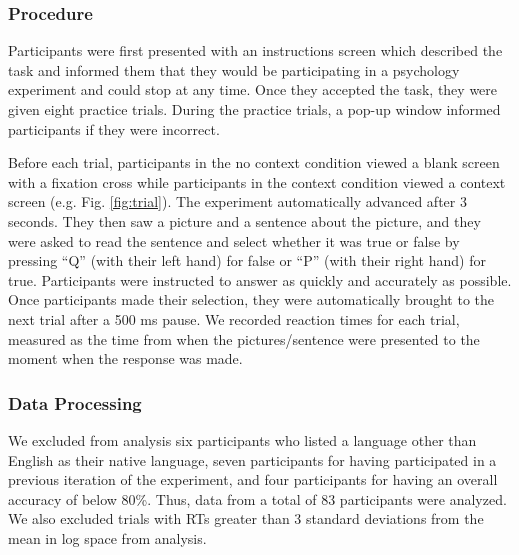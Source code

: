 \documentclass[10pt,letterpaper]{article}
\begin{document}
\subsubsection{Procedure}
Participants were first presented with an instructions screen which described the task and informed them that they would be participating in a psychology experiment and could stop at any time.  Once they accepted the task, they were given eight practice trials.  During the practice trials, a pop-up window informed participants if they were incorrect.  

Before each trial, participants in the no context condition viewed a blank screen with a fixation cross while participants in the context condition viewed a context screen (e.g. Fig. \ref{fig:trial}).  The experiment automatically advanced after 3 seconds.  They then saw a picture and a sentence about the picture, and they were asked to read the sentence and select whether it was true or false by pressing ``Q'' (with their left hand) for false or ``P'' (with their right hand) for true.  Participants were instructed to answer as quickly and accurately as possible.  Once participants made their selection, they were automatically brought to the next trial after a 500 ms pause.  We recorded reaction times for each trial, measured as the time from when the pictures/sentence were presented to the moment when the response was made.


\subsubsection{Data Processing}

We excluded from analysis six participants who listed a language other than English as their native language, seven participants for having participated in a previous iteration of the experiment, and four participants for having an overall accuracy of below 80\%.  Thus, data from a total of 83 participants were analyzed.  We also excluded trials with RTs greater than 3 standard deviations from the mean in log space from analysis.  
\end{document}
